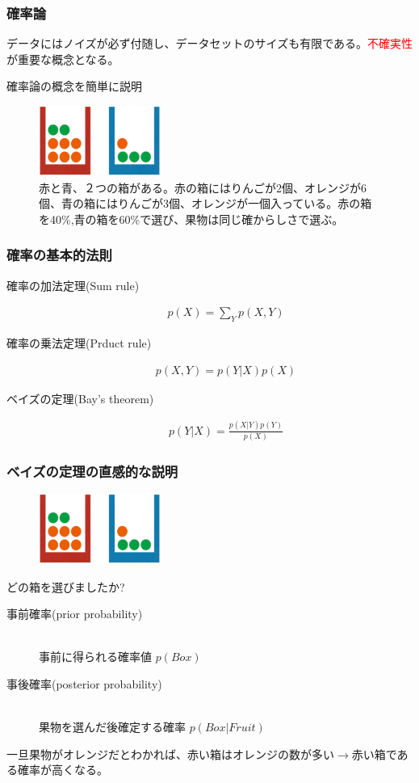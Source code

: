 \documentclass[dvipdfmx]{beamer}
\theoremstyle{definition}
\begin{document}
\begin{frame}
  \frametitle{確率論}
  データにはノイズが必ず付随し、データセットのサイズも有限である。\textcolor{red}{不確実性}が重要な概念となる。
  
  \begin{block}{確率論の概念を簡単に説明}
    \begin{figure}[htb]
      \centering
      \includegraphics[width=4.0cm,clip]{res/probability.eps}
      \caption{赤と青、２つの箱がある。赤の箱にはりんごが2個、オレンジが6個、青の箱にはりんごが3個、オレンジが一個入っている。赤の箱を40\%,青の箱を60\%で選び、果物は同じ確からしさで選ぶ。}
    \end{figure}
  \end{block}
\end{frame}

\begin{frame}
  \frametitle{確率の基本的法則}
  \begin{description}
    \item[確率の加法定理(Sum rule)]
      \begin{gather*}
        p(X)=\sum_{Y} p(X,Y)
      \end{gather*}
    \item[確率の乗法定理(Prduct rule)]
      \begin{gather*}
        p(X,Y)=p(Y|X)p(X)
      \end{gather*}
    \item[ベイズの定理(Bay's theorem)]
      \begin{gather*}
        p(Y|X) = \frac{p(X|Y)p(Y)}{p(X)}
      \end{gather*}
  \end{description}
\end{frame}
\begin{frame}
  \frametitle{ベイズの定理の直感的な説明}
  \begin{figure}[htb]
    \centering
    \includegraphics[width=4.0cm,clip]{res/probability.eps}
  \end{figure}
  どの箱を選びましたか?
  \begin{description}
    \item[事前確率(prior probability)] \hfill \\
      事前に得られる確率値 $p(Box)$
    \item[事後確率(posterior probability)] \hfill \\
      果物を選んだ後確定する確率 $p(Box|Fruit)$
  \end{description}
  一旦果物がオレンジだとわかれば、赤い箱はオレンジの数が多い$\to$赤い箱である確率が高くなる。
\end{frame}
\end{document}
